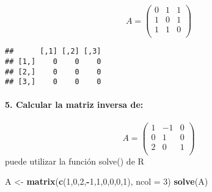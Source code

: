 \documentclass[]{article}
\newenvironment{Shaded}{\begin{snugshade}}{\end{snugshade}}
\newcommand{\DataTypeTok}[1]{\textcolor[rgb]{0.13,0.29,0.53}{#1}}
\newcommand{\DecValTok}[1]{\textcolor[rgb]{0.00,0.00,0.81}{#1}}
\newcommand{\KeywordTok}[1]{\textcolor[rgb]{0.13,0.29,0.53}{\textbf{#1}}}
\newcommand{\NormalTok}[1]{#1}
\newcommand{\OperatorTok}[1]{\textcolor[rgb]{0.81,0.36,0.00}{\textbf{#1}}}
\newcommand{\StringTok}[1]{\textcolor[rgb]{0.31,0.60,0.02}{#1}}
\let\oldparagraph\paragraph
\renewcommand{\paragraph}[1]{\oldparagraph{#1}\mbox{}}
\begin{document}
\[ A =  \begin{pmatrix}
0 & 1 & 1 \\
1 & 0 & 1 \\
1 & 1 & 0\\
\end{pmatrix}
\]

\begin{Shaded}
\end{Shaded}

\begin{verbatim}
##      [,1] [,2] [,3]
## [1,]    0    0    0
## [2,]    0    0    0
## [3,]    0    0    0
\end{verbatim}

\hypertarget{calcular-la-matriz-inversa-de}{%
\paragraph{5. Calcular la matriz inversa
de:}\label{calcular-la-matriz-inversa-de}}

\[ A = 
 \begin{pmatrix}
1 & -1& 0 \\
0 & 1 & 0 \\
2 & 0 & 1\\
\end{pmatrix}
\] puede utilizar la función solve() de R

\begin{Shaded}
\begin{Highlighting}[]
\NormalTok{A <-}\StringTok{ }\KeywordTok{matrix}\NormalTok{(}\KeywordTok{c}\NormalTok{(}\DecValTok{1}\NormalTok{,}\DecValTok{0}\NormalTok{,}\DecValTok{2}\NormalTok{,}\OperatorTok{-}\DecValTok{1}\NormalTok{,}\DecValTok{1}\NormalTok{,}\DecValTok{0}\NormalTok{,}\DecValTok{0}\NormalTok{,}\DecValTok{0}\NormalTok{,}\DecValTok{1}\NormalTok{), }\DataTypeTok{ncol =} \DecValTok{3}\NormalTok{)}
\KeywordTok{solve}\NormalTok{(A)}
\end{Highlighting}
\end{Shaded}
\end{document}
